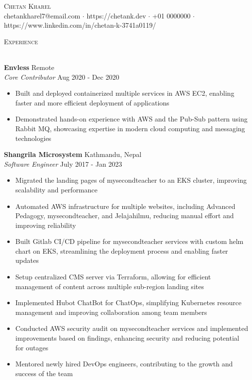 \documentclass[a4paper]{article}
\newcommand{\lineunder} {
    \vspace*{-8pt} \\
    \hspace*{-18pt} \hrulefill \\
}
\newcommand{\header} [1] {
    {\hspace*{-18pt}\vspace*{6pt} \textsc{#1}}
    \vspace*{-6pt} \lineunder
}
\begin{document}
\vspace*{-40pt}

    

\vspace*{-10pt}
\begin{center}
	{\Huge \scshape {Chetan Kharel}}\\
	chetankharel7@email.com $\cdot$ https://chetank.dev $\cdot$ +01 0000000 $\cdot$ https://www.linkedin.com/in/chetan-k-3741a0119/\\
\end{center}


\header{Experience}
\vspace{1mm}

\textbf{Envless} \hfill Remote\\
\textit{Core Contributor} \hfill Aug 2020 - Dec 2020\\
\vspace{-1mm}
\begin{itemize} \itemsep 1pt
	\item Built and deployed containerized multiple services in AWS EC2, enabling faster and more efficient deployment of applications
	\item Demonstrated hands-on experience with AWS and the Pub-Sub pattern using Rabbit MQ, showcasing expertise in modern cloud computing and messaging technologies
\end{itemize}

\textbf{Shangrila Microsystem} \hfill Kathmandu, Nepal\\
\textit{Software Engineer} \hfill July 2017 - Jan 2023\\
\vspace{-1mm}
\begin{itemize} \itemsep 1pt
	\item Migrated the landing pages of mysecondteacher to an EKS cluster, improving scalability and performance
	\item Automated AWS infrastructure for multiple websites, including Advanced Pedagogy, mysecondteacher, and Jelajahilmu, reducing manual effort and improving reliability
	\item Built Gitlab CI/CD pipeline for mysecondteacher services with custom helm chart on EKS, streamlining the deployment process and enabling faster updates
	\item Setup centralized CMS server via Terraform, allowing for efficient management of content across multiple sub-region landing sites
	\item Implemented Hubot ChatBot for ChatOps, simplifying Kubernetes resource management and improving collaboration among team members
	\item Conducted AWS security audit on mysecondteacher services and implemented improvements based on findings, enhancing security and reducing potential for outages
	\item Mentored newly hired DevOps engineers, contributing to the growth and success of the team
\end{itemize}
\end{document}
